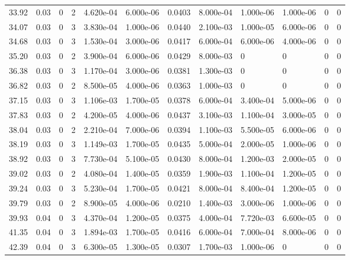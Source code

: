 \documentclass[preview]{standalone}
\begin{document}
{{{\begin{tabular}{L{1.2cm}C{1.2cm} C{0.3cm}C{0.5cm} C{1.4cm}C{1.4cm} C{1.4cm}C{1.4cm} C{1.6cm}C{1.6cm} C{1.6cm}C{1.6cm}}
  33.92  &  0.03  & 0     &  2 &  4.620e-04  & 6.000e-06  &  0.0403&   8.000e-04& 1.000e-06 & 1.000e-06   &  0 & 0  \\ 
  34.07  &  0.03  & 0     &  3 &  3.830e-04  & 1.000e-06  &  0.0440&   2.100e-03& 1.000e-05 & 6.000e-06   &  0 & 0  \\ 
  34.68  &  0.03  & 0     &  3 &  1.530e-04  & 3.000e-06  &  0.0417&   6.000e-04& 6.000e-06 & 4.000e-06   &  0 & 0  \\ 
  35.20  &  0.03  & 0     &  2 &  3.900e-04  & 6.000e-06  &  0.0429&   8.000e-03& 0 & 0   &  0 & 0  \\ 
  36.38  &  0.03  & 0     &  3 &  1.170e-04  & 3.000e-06  &  0.0381&   1.300e-03& 0 & 0   &  0 & 0  \\ 
  36.82  &  0.03  & 0     &  2 &  8.500e-05  & 4.000e-06  &  0.0363&   1.000e-03& 0 & 0   &  0 & 0  \\ 
  37.15  &  0.03  & 0     &  3 &  1.106e-03  & 1.700e-05  &  0.0378&   6.000e-04& 3.400e-04 & 5.000e-06   &  0 & 0  \\ 
  37.83  &  0.03  & 0     &  2 &  4.200e-05  & 4.000e-06  &  0.0437&   3.100e-03& 1.100e-04 & 3.000e-05   &  0 & 0  \\ 
  38.04  &  0.03  & 0     &  2 &  2.210e-04  & 7.000e-06  &  0.0394&   1.100e-03& 5.500e-05 & 6.000e-06   &  0 & 0  \\ 
  38.19  &  0.03  & 0     &  3 &  1.149e-03  & 1.700e-05  &  0.0435&   5.000e-04& 2.000e-05 & 1.000e-06   &  0 & 0  \\ 
  38.92  &  0.03  & 0     &  3 &  7.730e-04  & 5.100e-05  &  0.0430&   8.000e-04& 1.200e-03 & 2.000e-05   &  0 & 0  \\ 
  39.02  &  0.03  & 0     &  2 &  4.080e-04  & 1.400e-05  &  0.0359&   1.900e-03& 1.100e-04 & 1.200e-05   &  0 & 0  \\ 
  39.24  &  0.03  & 0     &  3 &  5.230e-04  & 1.700e-05  &  0.0421&   8.000e-04& 8.400e-04 & 1.200e-05   &  0 & 0  \\ 
  39.79  &  0.03  & 0     &  2 &  8.900e-05  & 4.000e-06  &  0.0210&   1.400e-03& 3.000e-06 & 1.000e-06   &  0 & 0  \\ 
  39.93  &  0.04  & 0     &  3 &  4.370e-04  & 1.200e-05  &  0.0375&   4.000e-04& 7.720e-03 & 6.600e-05   &  0 & 0  \\ 
  41.35  &  0.04  & 0     &  3 &  1.894e-03  & 1.700e-05  &  0.0416&   6.000e-04& 7.000e-04 & 8.000e-06   &  0 & 0  \\ 
  42.39  &  0.04  & 0     &  3 &  6.300e-05  & 1.300e-05  &  0.0307&   1.700e-03& 1.000e-06 & 0   &  0 & 0  \\ 

\end{tabular}}}}
\end{document}
